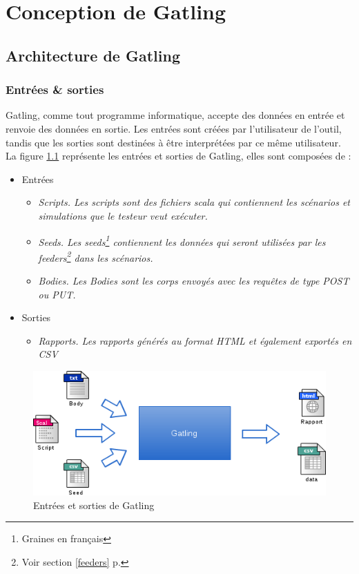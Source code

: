 \chapter{Conception de Gatling}
\label{chap_conception}

\section{Architecture de Gatling}
\subsection{Entrées \& sorties}
Gatling, comme tout programme informatique, accepte des données en entrée et renvoie des données en sortie. Les entrées sont créées par l'utilisateur de l'outil, tandis que les sorties sont destinées à être interprétées par ce même utilisateur. La figure \ref{io} représente les entrées et sorties de Gatling, elles sont composées de :

\begin{itemize}
  \item Entrées
  \begin{itemize}
	\item \em{Scripts}. Les scripts sont des fichiers scala qui contiennent les scénarios et simulations que le testeur veut exécuter.
  	\item \em{Seeds}. Les seeds\footnote{Graines en français} contiennent les données qui seront utilisées par les feeders\footnote{Voir section \ref{feeders} p.\pageref{feeders}} dans les scénarios.
  	\item \em{Bodies}. Les Bodies sont les corps envoyés avec les requêtes de type POST ou PUT.
  \end{itemize}
  \item Sorties
  \begin{itemize}
    \item \em{Rapports}. Les rapports générés au format HTML et également exportés en CSV
  \end{itemize}
\end{itemize}

\begin{figure}[h]
\begin{center}
\includegraphics[width=400pt]{img/io.png}
\end{center}
\caption{Entrées et sorties de Gatling}
\label{io}
\end{figure}

